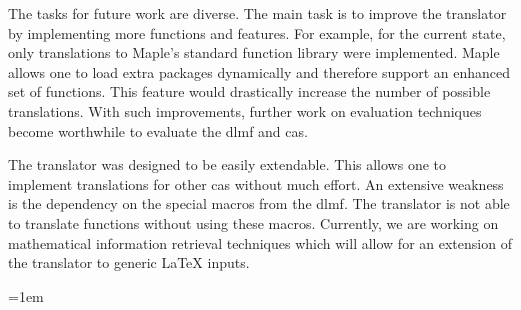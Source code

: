 \documentclass[a4paper,11pt]{article}
\newcommand{\Maple}{Maple}
\theoremstyle{defTheoStyle}
\theoremstyle{defExampStyle}
\begin{document}
The tasks for future work are diverse. The main task is to improve the translator by implementing more functions and features. For example, for the current state, only translations to \Maple's standard function library were implemented. \Maple{} allows one to load extra packages dynamically and therefore support an enhanced set of functions. This feature would drastically increase the number of possible translations. With such improvements, further work on evaluation techniques become worthwhile to evaluate the \gls*{dlmf} and \gls*{cas}.

The translator was designed to be easily extendable. This allows one to implement translations for other \gls*{cas} without much effort.
An extensive weakness is the dependency on the special macros from the \gls*{dlmf}. The translator is not able to translate functions without using these macros. Currently, we are working on mathematical information retrieval techniques which will allow for an extension of the translator to generic \LaTeX{} inputs. 

\emergencystretch=1em
\printbibliography
\end{document}
